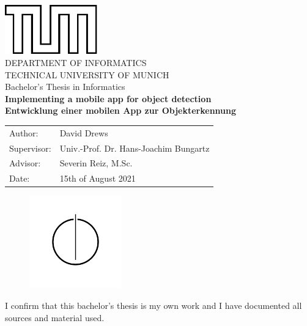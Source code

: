 \documentclass[11pt,
               a4paper,
               bibtotoc,
               idxtotoc,
               headsepline,
               footsepline,
               footexclude,
               BCOR12mm,
               DIV13,
               openany,   %
               ]
               {scrbook}
\def\doctype{Bachelor's Thesis\xspace}
\def\studyProgram{Informatics}
\def\title{Implementing a mobile app for object detection}
\def\titleGer{Entwicklung einer mobilen App zur Objekterkennung}
\def\author{David Drews}
\def\supervisor{Univ.-Prof. Dr. Hans-Joachim Bungartz}
\def\advisor{Severin Reiz, M.Sc.}
\def\date{15th of August 2021}
\begin{document}
\def\bcorcor{0.15cm}
\addtolength{\hoffset}{\bcorcor}
\thispagestyle{empty}
\vspace{10mm}
\begin{center}
    \includegraphics[width=4cm]{templateStuff/tumlogo.pdf}\\[5mm]
	\huge DEPARTMENT OF INFORMATICS\\[5mm]
	\large TECHNICAL UNIVERSITY OF MUNICH\\[24mm]
	{\Large \doctype in \studyProgram}\\[20mm]
	{\LARGE\bf \title}\\[10mm]
	{\LARGE\bf \titleGer}\\[10mm]
	\begin{tabular}{ll}
		\Large Author:      	& \Large \author \\[2mm]
		\Large Supervisor:  	& \Large \supervisor\\[2mm]
		\Large Advisor:			& \Large \advisor\\[2mm]
		\Large Date:       		& \Large \date
	\end{tabular}
	\vspace{-1mm}
	\begin{figure}[h!]
		\centering
		\includegraphics[width=4cm]{templateStuff/informat.pdf}
	\end{figure}
\end{center}

\addtolength{\hoffset}{\bcorcor}
\newpage


\cleardoubleemptypage

\thispagestyle{empty}
\vspace*{0.7\textheight}
\noindent
I confirm that this \MakeLowercase{\doctype} is my own work and I have documented all sources and material used.\\
\end{document}
